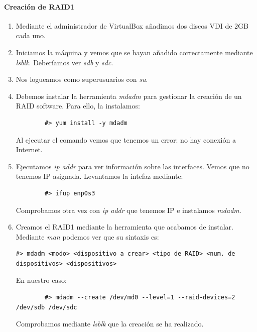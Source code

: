 \documentclass[12pt,spanish]{article}
\begin{document}
\paragraph{Creación de RAID1}
\begin{enumerate}
	\item Mediante el administrador de VirtualBox añadimos dos discos VDI de 2GB cada uno.
	\item Iniciamos la máquina y vemos que se hayan añadido correctamente mediante \textit{lsblk}. Deberíamos ver \textit{sdb} y \textit{sdc}.
	\item Nos logueamos como superusuarios con \textit{su}.
	\item Debemos instalar la herramienta \textit{mdadm} para gestionar la creación de un RAID software. Para ello, la instalamos:
	\begin{lstlisting}
		#> yum install -y mdadm
	\end{lstlisting}
	Al ejecutar el comando vemos que tenemos un error: no hay conexión a Internet.
	\item Ejecutamos \textit{ip addr} para ver información sobre las interfaces. Vemos que no tenemos IP asignada. Levantamos la intefaz mediante:
	\begin{lstlisting}
		#> ifup enp0s3
	\end{lstlisting}
	Comprobamos otra vez con \textit{ip addr} que tenemos IP e instalamos \textit{mdadm}.
	\item Creamos el RAID1 mediante la herramienta que acabamos de instalar. Mediante \textit{man} podemos ver que su sintaxis es:
	\begin{lstlisting}[breaklines=true]
		#> mdadm <modo> <dispositivo a crear> <tipo de RAID> <num. de dispositivos> <dispositivos>
	\end{lstlisting}
	En nuestro caso:
	\begin{lstlisting}
		#> mdadm --create /dev/md0 --level=1 --raid-devices=2 /dev/sdb /dev/sdc
	\end{lstlisting}
	Comprobamos mediante \textit{lsblk} que la creación se ha realizado.
\end{enumerate}
\end{document}
